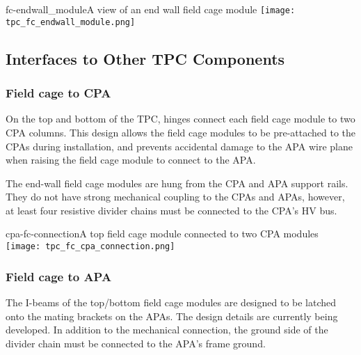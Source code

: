 \begin{cdrfigure}{fc-endwall_module}{A view of an end wall field cage module}
\texttt{[image: tpc\_fc\_endwall\_module.png]}
\end{cdrfigure}


\subsection{Interfaces to Other TPC Components}

\subsubsection{Field cage to CPA}

On the top and bottom of the TPC, hinges connect each field cage module to two CPA columns.  This design allows the field cage modules to be pre-attached to the CPAs during installation, and prevents accidental damage to the APA wire plane when raising the field cage module to connect %
to the APA.

The end-wall field cage modules are hung from the CPA and APA support rails.  They do not have strong mechanical coupling to the CPAs and APAs, however, at least four resistive divider chains must be connected to the CPA's HV bus.

\begin{cdrfigure}{cpa-fc-connection}{A top field cage module connected to two CPA modules}
\texttt{[image: tpc\_fc\_cpa\_connection.png]}
\end{cdrfigure}


\subsubsection{Field cage to APA}

The I-beams of the top/bottom field cage modules are designed to be latched onto the mating brackets on the APAs.  The design details are currently being developed. %
In addition to the mechanical connection, the ground side of the divider chain must be connected to the APA's frame ground. %


